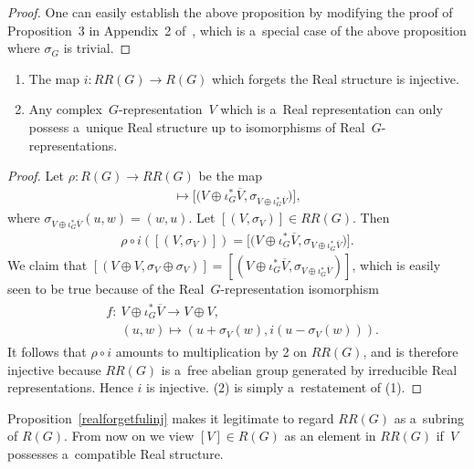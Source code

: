 \begin{proof}
One can easily establish the above proposition
by modifying the proof of Proposition~3 in Appendix~2 of~\cite{B}, which
is a~special case of the above proposition
where $\sigma_G$ is trivial.
\end{proof}
\begin{Proposition}\label{realforgetfulinj}\quad
\begin{enumerate}\itemsep=0pt
\item[$1.$]
The map
$i: RR(G)\to R(G)$ which forgets the Real structure is injective.
\item[$2.$]
Any complex~$G$-representation~$V$ which is a~Real representation can only possess a~unique Real structure up to
isomorphisms of Real~$G$-representations.
\end{enumerate}
\end{Proposition}
\begin{proof}
Let $\rho: R(G)\to RR(G)$ be the map
\begin{gather*}
[V]\mapsto \big[\big(V\oplus\iota_G^*\overline{V},\sigma_{V\oplus\iota_G^*\overline{V}}\big)\big],
\end{gather*}
where $\sigma_{V\oplus\iota_G^*\overline{V}}(u, w)=(w, u)$.
Let $[(V,
\sigma_V)]\in RR(G)$.
Then
\begin{gather*}
\rho\circ i([(V,\sigma_V)])=\big[\big(V\oplus\iota_G^*\overline{V},\sigma_{V\oplus\iota_G^*\overline{V}}\big)\big].
\end{gather*}
We claim that $[(V\oplus V,\sigma_V\oplus\sigma_V)]=[(V\oplus\iota_G^*\overline{V},
\sigma_{V\oplus\iota_G^*\overline{V}})]$, which is easily seen to be true because of the Real~$G$-representation isomorphism
\begin{gather*}
\begin{split}
& f: \ V\oplus \iota_G^*\overline{V}  \to  V\oplus V,
\\
& \phantom{f:{}} \ (u, w)  \mapsto  (u+\sigma_V(w), i(u-\sigma_V(w))).
\end{split}
\end{gather*}
It follows that $\rho\circ i$ amounts to multiplication by 2 on $RR(G)$, and is therefore injective because $RR(G)$ is
a~free abelian group generated by irreducible Real representations.
Hence $i$ is injective.
(2) is simply a~restatement of (1).
\end{proof}
Proposition~\ref{realforgetfulinj} makes it legitimate to regard $RR(G)$ as a~subring of $R(G)$.
From now on we view $[V]\in R(G)$ as an element in $RR(G)$ if~$V$ possesses a~compatible Real structure.
